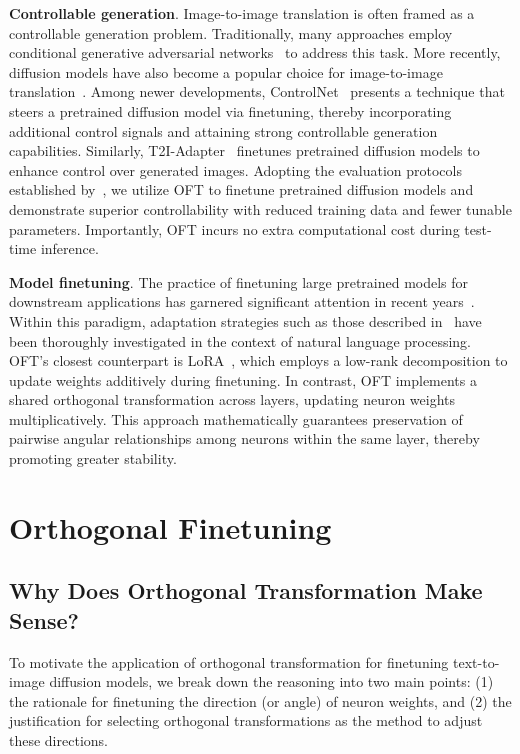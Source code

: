 \textbf{Controllable generation}. Image-to-image translation is often framed as a controllable generation problem. Traditionally, many approaches employ conditional generative adversarial networks~\cite{isola2017image,zhu2017toward,wang2018high,park2019semantic,choi2018stargan} to address this task. More recently, diffusion models have also become a popular choice for image-to-image translation~\cite{saharia2022palette,voynov2022sketch,wang2022pretraining}. Among newer developments, ControlNet~\cite{zhang2023adding} presents a technique that steers a pretrained diffusion model via finetuning, thereby incorporating additional control signals and attaining strong controllable generation capabilities. Similarly, T2I-Adapter~\cite{mou2023t2i} finetunes pretrained diffusion models to enhance control over generated images. Adopting the evaluation protocols established by~\cite{zhang2023adding,mou2023t2i}, we utilize OFT to finetune pretrained diffusion models and demonstrate superior controllability with reduced training data and fewer tunable parameters. Importantly, OFT incurs no extra computational cost during test-time inference.

\textbf{Model finetuning}. The practice of finetuning large pretrained models for downstream applications has garnered significant attention in recent years~\cite{devlin2018bert,brown2020language,he2022masked}. Within this paradigm, adaptation strategies such as those described in~\cite{hulora2022,houlsby2019parameter,pfeiffer2020adapterfusion} have been thoroughly investigated in the context of natural language processing. OFT's closest counterpart is LoRA~\cite{hulora2022}, which employs a low-rank decomposition to update weights additively during finetuning. In contrast, OFT implements a shared orthogonal transformation across layers, updating neuron weights multiplicatively. This approach mathematically guarantees preservation of pairwise angular relationships among neurons within the same layer, thereby promoting greater stability.

\section{Orthogonal Finetuning}

\subsection{Why Does Orthogonal Transformation Make Sense?}

To motivate the application of orthogonal transformation for finetuning text-to-image diffusion models, we break down the reasoning into two main points: (1) the rationale for finetuning the direction (or angle) of neuron weights, and (2) the justification for selecting orthogonal transformations as the method to adjust these directions.

